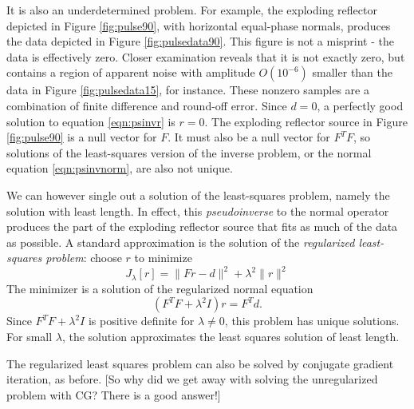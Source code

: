 It is also an underdetermined problem. For example, the exploding reflector  depicted in Figure \ref{fig:pulse90}, with horizontal equal-phase normals, produces the data depicted in Figure \ref{fig:pulsedata90}. This figure is not a misprint - the data is effectively zero. Closer examination reveals that it is not exactly zero, but contains a region of apparent noise with amplitude $O(10^{-6})$ smaller than the data in Figure \ref{fig:pulsedata15}, for instance. These nonzero samples are a combination of finite difference and round-off error. 
Since $d=0$, a perfectly good solution to equation \ref{eqn:psinvr} is $r=0$. The exploding reflector source in Figure \ref{fig:pulse90} is a null vector for $F$. It must also be a null vector for $F^TF$, so solutions of the least-squares version of the inverse problem, or the normal equation \ref{eqn:psinvnorm}, are also not unique.

We can however single out a solution of the least-squares problem, namely the solution with least length. In effect, this {\em pseudoinverse} to the normal operator produces the part of the exploding reflector source that fits as much of the data as possible. A standard approximation is the solution of the {\em regularized least-squares problem}: choose $r$ to minimize
\begin{equation}
\label{eqn:psinvreg}
J_{\lambda}[r] = \|Fr -d\|^2 + \lambda^2 \|r\|^2
\end{equation}
The minimizer is a solution of the regularized normal equation
\begin{equation}
\label{eqn:psinvregnorm}
(F^TF + \lambda^2 I)r = F^Td.
\end{equation}
Since $F^TF + \lambda^2I$ is positive definite for $\lambda \ne 0$, this problem has unique solutions. For small $\lambda$, the solution approximates the least squares solution of least length.

The regularized least squares problem can also be solved by conjugate gradient iteration, as before. [So why did we get away with solving the unregularized problem with CG? There is a good answer!]

